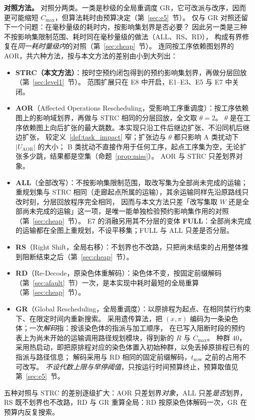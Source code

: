 \documentclass[manuscript,screen,review]{acmart}
\providecommand{\STRC}{\textsc{STRC}}
\begin{document}
\textbf{对照方法。}
\label{sec:vs_r0}
对照分两类。一类是秒级的全局重调度 GR，它可改派与改序，因而更可能缩短 \(C_{\max}\)，但算法耗时由预算决定（第~\ref{sec:e5}~节）。
仅与 GR 对照还留下一个问题：在毫秒量级的耗时内，按影响集划界是否必要？
因此另一类是三种不按影响集限制范围、耗时同在毫秒量级的做法（ALL、RS、RD），
构成有界修复在\emph{同一耗时量级内}的对照（第~\ref{sec:cheap}~节）。
连同按工序依赖图划界的 AOR，共六种方法，按与本文方法的差别由小到大列出：
\begin{itemize}[leftmargin=1.5em,itemsep=0.2em]
\item \textbf{\STRC{}（本文方法）}：按时空预约闭包得到的预约影响集划界，再做分层回放（第~\ref{sec:level1}~节）。
范围扩展只在 E8 中开启，E1--E3、E5 与 E7 中关闭。
\item \textbf{AOR}（Affected Operations Rescheduling，受影响工序重调度）：按工序依赖图上的影响域划界，再做与 \STRC{} 相同的分层回放，全文取 \(\theta=2\)。
\(\theta\) 是在工序依赖图上向后扩张的最大跳数。本实现只沿工件后继边扩张、不沿同机后继边扩张，
较定义~\ref{def:task_impact} 窄；扩张边与 \(\theta\) 都只影响 A 类扰动下 \(|U_{\mathrm{AOR}}|\) 的大小；
B 类扰动不直接作用于任何工序，起点工序集为空，无论扩张多少跳，结果都是空集（命题~\ref{prop:miss}）。
AOR 与 \STRC{} 只差划界对象。
\item \textbf{ALL}（全部改写）：不按影响集限制范围，取改写集为全部尚未完成的运输；
重规划集与 \STRC{} 相同（走廊起点所属的运输），其余运输同样先沿原路线只改时刻，分层回放程序完全相同，
因而与本文方法只差「改写集取 \(W\) 还是全部尚未完成的运输」这一项，是唯一能单独检验预约影响集作用的对照（第~\ref{sec:cheap}~节）。
E7 的消融另用其不分层的变体 \textbf{FULL}：全部尚未完成的运输都在全图上重规划，不设平移集；FULL 与 ALL 只差是否分层。
\item \textbf{RS}（Right Shift，全局右移）：不划界也不改路，只把尚未结束的占用整体推到阻断结束之后（第~\ref{sec:cheap}~节）。
\item \textbf{RD}（Re-Decode，原染色体重解码）：染色体不变，按固定前缀解码（第~\ref{sec:afault}~节）一次，是本实现中耗时最短的全局重算（第~\ref{sec:cheap}~节）。
\item \textbf{GR}（Global Rescheduling，全局重调度）：以原排程为起点、在相同禁行约束下、在限定时间内重新搜索。
采用遗传算法，把 \((x,\pi)\) 编码为一条染色体；一次\emph{解码}指：按该染色体的指派与加工顺序，
在已写入阻断时段的预约表上为尚未开始的运输调用路径规划模块，得到新的 \(R\) 与 \(C_{\max}\)。
种群 \(40\)，采用热启动，即把原排程对应的染色体置入初始种群，以免丢掉原排程已有的指派与路径信息；
解码采用与 RD 相同的固定前缀解码，\(t_{\mathrm{now}}\) 之前的占用不可改写。
\emph{不设代数上限与早停阈值}，只按运行时间预算终止，预算取值见第~\ref{sec:e5}~节。
\end{itemize}
五种对照与 \STRC{} 的差别逐级扩大：AOR 只差划界\emph{对象}，ALL 只差\emph{是否}划界，
RS 既不划界也不改路，RD 与 GR 重算全局：RD 按原染色体解码一次，GR 在预算内反复搜索。
\end{document}
